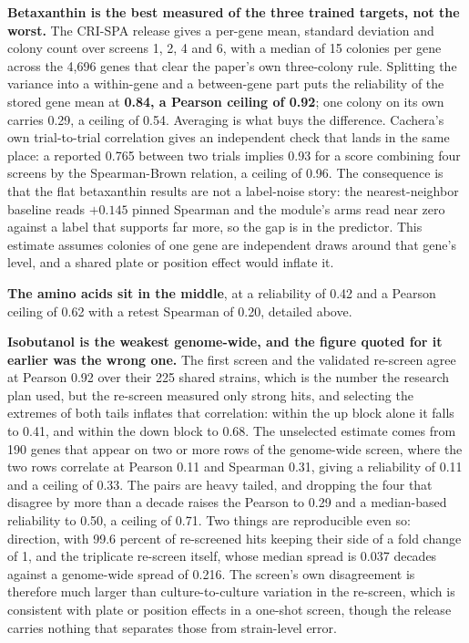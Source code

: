 

\textbf{Betaxanthin is the best measured of the three trained targets, not the worst.} The
CRI-SPA release gives a per-gene mean, standard deviation and colony count over screens 1,
2, 4 and 6, with a median of 15 colonies per gene across the 4{,}696 genes that clear the
paper's own three-colony rule. Splitting the variance into a within-gene and a between-gene
part puts the reliability of the stored gene mean at \textbf{0.84, a Pearson ceiling of
0.92}; one colony on its own carries 0.29, a ceiling of 0.54. Averaging is what buys the
difference. Cachera's own trial-to-trial correlation gives an independent check that lands
in the same place: a reported 0.765 between two trials implies 0.93 for a score combining
four screens by the Spearman-Brown relation, a ceiling of 0.96. The consequence is that the
flat betaxanthin results are not a label-noise story: the nearest-neighbor baseline reads
$+0.145$ pinned Spearman and the module's arms read near zero against a label that supports
far more, so the gap is in the predictor. This estimate assumes colonies of one gene are
independent draws around that gene's level, and a shared plate or position effect would
inflate it.

\textbf{The amino acids sit in the middle}, at a reliability of 0.42 and a Pearson ceiling
of 0.62 with a retest Spearman of 0.20, detailed above.

\textbf{Isobutanol is the weakest genome-wide, and the figure quoted for it earlier was the
wrong one.} The first screen and the validated re-screen agree at Pearson 0.92 over their
225 shared strains, which is the number the research plan used, but the re-screen measured
only strong hits, and selecting the extremes of both tails inflates that correlation: within
the up block alone it falls to 0.41, and within the down block to 0.68. The unselected
estimate comes from 190 genes that appear on two or more rows of the genome-wide screen,
where the two rows correlate at Pearson 0.11 and Spearman 0.31, giving a reliability of 0.11
and a ceiling of 0.33. The pairs are heavy tailed, and dropping the four that disagree by
more than a decade raises the Pearson to 0.29 and a median-based reliability to 0.50, a
ceiling of 0.71. Two things are reproducible even so: direction, with 99.6 percent of
re-screened hits keeping their side of a fold change of 1, and the triplicate re-screen
itself, whose median spread is 0.037 decades against a genome-wide spread of 0.216. The
screen's own disagreement is therefore much larger than culture-to-culture variation in the
re-screen, which is consistent with plate or position effects in a one-shot screen, though
the release carries nothing that separates those from strain-level error.

